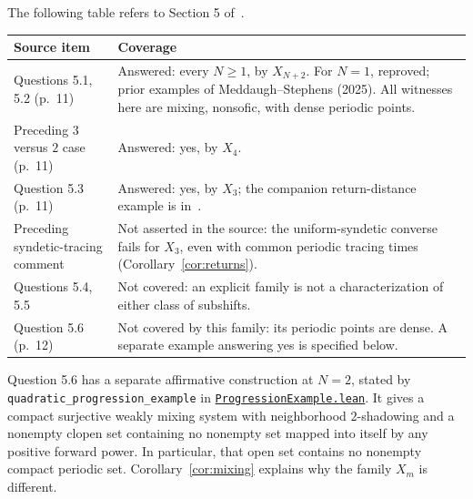 \documentclass[11pt]{article}
\begin{document}
\noindent The following table refers to Section 5 of~\cite{MS}.
\begin{center}
\begin{tabular}{@{}>{\raggedright\arraybackslash}p{.22\linewidth}>{\raggedright\arraybackslash}p{.71\linewidth}@{}}
\toprule
Source item&Coverage\\\midrule
Questions 5.1, 5.2 (p.\ 11)&Answered: every $N\geq1$, by $X_{N+2}$.
For $N=1$, reproved; prior examples of Meddaugh--Stephens (2025).
All witnesses here are mixing, nonsofic, with dense periodic points.\\
Preceding $3$ versus $2$ case (p.\ 11)&Answered: yes, by $X_4$.\\
Question 5.3 (p.\ 11)&Answered: yes, by $X_3$; the companion
return-distance example is in~\cite{MZ}.\\
Preceding syndetic-tracing comment&Not asserted in the source: the
uniform-syndetic converse fails for $X_3$, even with common periodic
tracing times (Corollary~\ref{cor:returns}).\\
Questions 5.4, 5.5&Not covered: an explicit family is not a characterization
of either class of subshifts.\\
Question 5.6 (p.\ 12)&Not covered by this family: its periodic points
are dense. A separate example answering yes is specified below.\\\bottomrule
\end{tabular}
\end{center}

Question 5.6 has a separate affirmative construction at $N=2$, stated by
\nolinkurl{quadratic_progression_example} in
\href{https://github.com/the-omega-institute/trureturing/blob/147008bff5524a3dccf0efa3ed9e76fb6b168a50/D5/S1/Dynamics/Shadowing/ProgressionExample.lean}{\texttt{ProgressionExample.lean}}.
It gives a compact surjective weakly mixing system with neighborhood
$2$-shadowing and a nonempty clopen set containing no nonempty set
mapped into itself by any positive forward power. In particular, that open set
contains no nonempty compact periodic set. Corollary~\ref{cor:mixing}
explains why the family $X_m$ is different.
\end{document}
